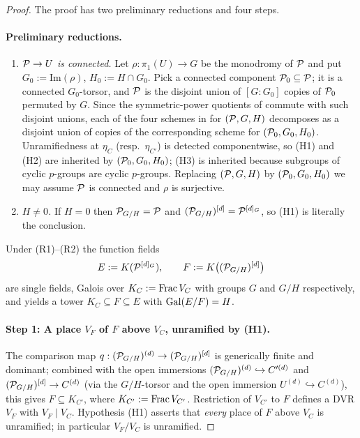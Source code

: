 \documentclass[11pt]{article}
\begin{document}
\begin{proof}
The proof has two preliminary reductions and four steps.

\paragraph{Preliminary reductions.}
\begin{enumerate}
\item[\textnormal{(R1)}] \emph{$\mathcal{P} \to U$ is connected.}  Let
      $\rho \colon \pi_1(U) \to G$ be the monodromy of $\mathcal{P}$ and put
      $G_0 := \mathrm{Im}(\rho)$, $H_0 := H \cap G_0$.  Pick a connected
      component $\mathcal{P}_0 \subseteq \mathcal{P}$; it is a connected $G_0$-torsor, and
      $\mathcal{P}$ is the disjoint union of $[G : G_0]$ copies of $\mathcal{P}_0$ permuted
      by $G$.  Since the symmetric-power quotients of
       commute with such disjoint
      unions, each of the four schemes in 
      for $(\mathcal{P}, G, H)$ decomposes as a disjoint union of copies of the
      corresponding scheme for $(\mathcal{P}_0, G_0, H_0)$.  Unramifiedness at
      $\eta_C$ (resp.\ $\eta_{C'}$) is detected componentwise, so (H1) and
      (H2) are inherited by $(\mathcal{P}_0, G_0, H_0)$; (H3) is inherited because
      subgroups of cyclic $p$-groups are cyclic $p$-groups.  Replacing
      $(\mathcal{P}, G, H)$ by $(\mathcal{P}_0, G_0, H_0)$ we may assume $\mathcal{P}$ is connected
      and $\rho$ is surjective.
\item[\textnormal{(R2)}] \emph{$H \neq 0$.}  If $H = 0$ then
      $\mathcal{P}_{G/H} = \mathcal{P}$ and $(\mathcal{P}_{G/H})^{[d]} = \mathcal{P}^{[d]_G}$, so (H1) is
      literally the conclusion.
\end{enumerate}
Under (R1)--(R2) the function fields
\[
E := K(\mathcal{P}^{[d]_G}), \qquad F := K\bigl((\mathcal{P}_{G/H})^{[d]}\bigr)
\]
are single fields, Galois over $K_C := \operatorname{Frac} V_C$ with groups $G$ and $G/H$
respectively, and  yields a tower
$K_C \subseteq F \subseteq E$ with $\operatorname{Gal}(E/F) = H$.

\paragraph{Step 1: A place $V_F$ of $F$ above $V_C$, unramified by (H1).}
The comparison map $q : (\mathcal{P}_{G/H})^{(d)} \to (\mathcal{P}_{G/H})^{[d]}$ is
generically finite and dominant; combined with the open immersions
$(\mathcal{P}_{G/H})^{(d)} \hookrightarrow C'^{(d)}$ and
$(\mathcal{P}_{G/H})^{[d]} \to C^{(d)}$ (via the $G/H$-torsor and the open immersion
$U^{(d)} \hookrightarrow C^{(d)}$), this gives $F \subseteq K_{C'}$, where
$K_{C'} := \operatorname{Frac} V_{C'}$.  Restriction of $V_{C'}$ to $F$ defines a DVR
$V_F$ with $V_F \mid V_C$.  Hypothesis (H1) asserts that \emph{every} place
of $F$ above $V_C$ is unramified; in particular $V_F/V_C$ is unramified.


\end{proof}
\end{document}
